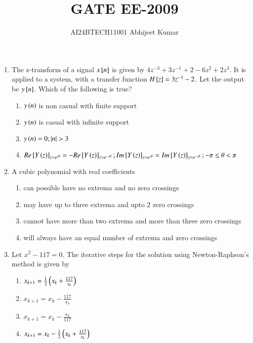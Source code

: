 \documentclass[journal]{IEEEtran}
\begin{document}

\vspace{3cm}


\renewcommand{\thefigure}{\theenumi}
\renewcommand{\thetable}{\theenumi}
\setlength{\intextsep}{10pt} %


\renewcommand{\thetable}{\theenumi}

\title{GATE EE-2009}
\author{AI24BTECH11001 Abhijeet Kumar
}
\maketitle
\renewcommand{\thefigure}{\theenumi}
\renewcommand{\thetable}{\theenumi}
\begin{enumerate}[start=37]
    \item The z-transform of a signal $x{}\left[n\right]$ is given by $4z^{-3} + 3z^{-1} + 2 - 6z^{2} + 2z^{3}$. It is applied to a system, with a transfer function $H{}\left[z\right] = 3z^{-1} -2$. Let the output be $y{}\left[n\right]$. Which of the following is true?
    \begin{enumerate}
        \item $y\left(n\right)$ is non casual with finite support
        \item $y\left(n\right)$ is casual with infinite support
        \item $y\left(n\right)=0 ; \left\vert n\right\vert>3$
        \item $Re{}\left[Y\left(z\right)\right]_{z=e^{j\theta}}=-Re{}\left[Y\left(z\right)\right]_{z=e^{-j\theta}};Im{}\left[Y\left(z\right)\right]_{z=e^{j\theta}}=Im{}\left[Y\left(z\right)\right]_{z=e^{-j\theta}};-\pi\leq \theta < \pi$
    \end{enumerate}


    \item A cubic polynomial with real coefficients
    \begin{enumerate}
        \item can possible have no extrema and no zero crossings
        \item may have up to three extrema and upto $2$ zero crossings
        \item cannot have more than two extrema and more than three zero crossings
        \item will always have an equal number of extrema and zero crossings
    \end{enumerate}

    \item Let $x^2 - 117 =0$. The iterative steps for the solution using Newton-Raphson's method is given by
    \begin{enumerate}
        \item $x_{k+1} = \frac{1}{2}\left(x_k + \frac{117}{x_k}\right)$
        \item $x_{k+1} = x_k - \frac{117}{x_k}$
        \item $x_{k+1} = x_k - \frac{x_k}{117}$
        \item $x_{k+1} = x_k - \frac{1}{2}\left(x_k + \frac{117}{x_k}\right)$
    \end{enumerate}


\end{enumerate}
\end{document}
